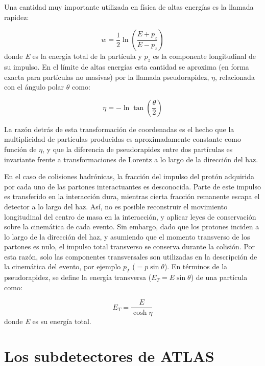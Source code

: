 Una cantidad muy importante utilizada en física de altas energías es la llamada rapidez:

\begin{equation}
w=\frac{1}{2}\ln\left( \frac{E+p_{z}}{E-p_{z}}\right)
\end{equation}
donde \textit{E} es la energía total de la partícula y $p_{z}$ es la componente longitudinal de su impulso. En el límite de altas energías esta cantidad se aproxima (en forma exacta para partículas no masivas) por la llamada pseudorapidez, $\eta$, relacionada con el ángulo polar $\theta$ como:

\begin{equation}
\eta =-\ln \tan\left( \frac{\theta}{2} \right)
\end{equation}

La razón detrás de esta transformación de coordenadas es el hecho que la multiplicidad de partículas producidas es aproximadamente constante como función de $\eta$, y que la diferencia de pseudorapidez entre dos partículas es invariante frente a transformaciones de Lorentz a lo largo de la dirección del haz. 

En el caso de colisiones hadrónicas, la fracción del impulso del protón adquirida por cada uno de las partones interactuantes es desconocida. Parte de este impulso es transferido en la interacción dura, mientras cierta fracción remanente escapa el detector a lo largo del haz. Así, no es posible reconstruir el movimiento longitudinal del centro de masa en la interacción, y aplicar leyes de conservación sobre la cinemática de cada evento. Sin embargo, dado que los protones inciden a lo largo de la dirección del haz, y asumiendo que el momento transverso de los partones es nulo, el impulso total transverso se conserva durante la colisión. Por esta razón, solo las componentes transversales son utilizadas en la descripción de la cinemática del evento, por ejemplo $p_{T}$ ($=p\sin\theta$). En términos de la pseudorapidez, se define la energía transversa ($E_{T}=E\sin\theta$) de una partícula como:

\begin{equation}
E_{T}=\frac{E}{\cosh \eta}
\end{equation}
donde \textit{E} es su energía total.

\section{Los subdetectores de ATLAS}

